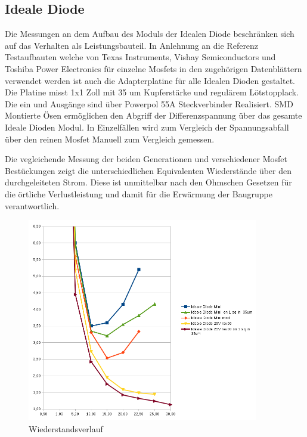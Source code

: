 \subsection{Ideale Diode}

Die Messungen an dem Aufbau des Moduls der Idealen Diode beschränken sich auf das Verhalten als Leistungsbauteil. 
In Anlehnung an die Referenz Testaufbauten welche von Texas Instruments, Vishay Semiconductors und Toshiba Power Electronics für einzelne Mosfets in den zugehörigen Datenblättern verwendet werden ist auch die Adapterplatine für alle Idealen Dioden gestaltet.
Die Platine misst 1x1 Zoll mit 35 um Kupferstärke und regulärem Lötstopplack. Die ein und Ausgänge sind über Powerpol 55A Steckverbinder Realisiert. SMD Montierte Ösen ermöglichen den Abgriff der Differenzspannung über das gesamte Ideale Dioden Modul. In Einzelfällen wird zum Vergleich der Spannungsabfall über den reinen Mosfet Manuell zum Vergleich gemessen.

Die vegleichende Messung der beiden Generationen und verschiedener Mosfet Bestückungen zeigt die unterschiedlichen Equivalenten Wiederstände über den durchgeleiteten Strom.
Diese ist unmittelbar nach den Ohmschen Gesetzen für die örtliche Verlustleistung und damit für die Erwärmung der Baugruppe verantwortlich.

\begin{figure}[H]
\centering
\includegraphics[width=0.9\textwidth]{graphen/Wiederstand-Strom-Ideale_Diode_ver00} 
\caption{Wiederstandsverlauf} 
\label{fig:Wiederstandsverlauf}
\end{figure}


